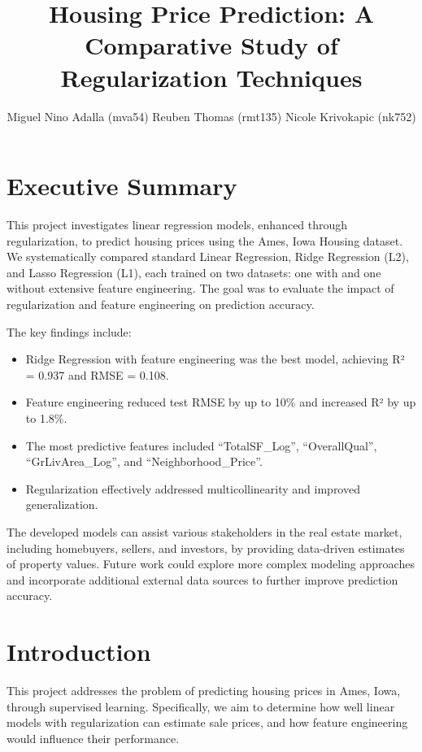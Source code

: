 \documentclass{article}
\title{Housing Price Prediction: A Comparative Study of Regularization Techniques}
\author{%
  Miguel Nino Adalla (mva54)
  \And
  Reuben Thomas (rmt135)
  \And
  Nicole Krivokapic (nk752)
}
\begin{document}
\maketitle

\section{Executive Summary}

This project investigates linear regression models, enhanced through regularization, to predict housing prices using the Ames, Iowa Housing dataset. We systematically compared standard Linear Regression, Ridge Regression (L2), and Lasso Regression (L1), each trained on two datasets: one with and one without extensive feature engineering. The goal was to evaluate the impact of regularization and feature engineering on prediction accuracy.

The key findings include:
\begin{itemize}
    \item Ridge Regression with feature engineering was the best model, achieving R² = 0.937 and RMSE = 0.108.
    \item Feature engineering reduced test RMSE by up to 10\% and increased R² by up to 1.8\%.
    \item The most predictive features included ``TotalSF\_Log'', ``OverallQual'', ``GrLivArea\_Log'', and ``Neighborhood\_Price''.
    \item Regularization effectively addressed multicollinearity and improved generalization.
\end{itemize}

The developed models can assist various stakeholders in the real estate market, including homebuyers, sellers, and investors, by providing data-driven estimates of property values. Future work could explore more complex modeling approaches and incorporate additional external data sources to further improve prediction accuracy.

\section{Introduction}

This project addresses the problem of predicting housing prices in Ames, Iowa, through supervised learning. Specifically, we aim to determine how well linear models with regularization can estimate sale prices, and how feature engineering would influence their performance.
\end{document}

